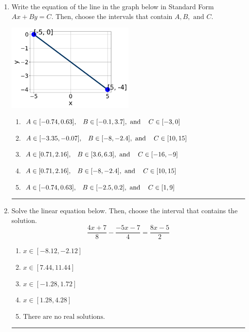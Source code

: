 \documentclass[14pt]{extbook}
\newcommand{\litem}[1]{\item#1\hspace*{-1cm}\rule{\textwidth}{0.4pt}}
\begin{document}
\begin{enumerate}
{\begin{enumerate}[label=\Alph*.]
\end{enumerate} }
\litem{
Write the equation of the line in the graph below in Standard Form $Ax+By=C$. Then, choose the intervals that contain $A, B, \text{ and } C$.
\begin{center}
    \includegraphics[width=0.5\textwidth]{../Figures/linearGraphToStandardB.png}
\end{center}
\begin{enumerate}[label=\Alph*.]
\item \( A \in [-0.74, 0.63], \hspace{3mm} B \in [-0.1, 3.7], \text{ and } \hspace{3mm} C \in [-3, 0] \)
\item \( A \in [-3.35, -0.07], \hspace{3mm} B \in [-8, -2.4], \text{ and } \hspace{3mm} C \in [10, 15] \)
\item \( A \in [0.71, 2.16], \hspace{3mm} B \in [3.6, 6.3], \text{ and } \hspace{3mm} C \in [-16, -9] \)
\item \( A \in [0.71, 2.16], \hspace{3mm} B \in [-8, -2.4], \text{ and } \hspace{3mm} C \in [10, 15] \)
\item \( A \in [-0.74, 0.63], \hspace{3mm} B \in [-2.5, 0.2], \text{ and } \hspace{3mm} C \in [1, 9] \)

\end{enumerate} }
\litem{
Solve the linear equation below. Then, choose the interval that contains the solution.\[ \frac{4x + 7}{8} - \frac{-5x -7}{4} = \frac{8x -5}{2} \]\begin{enumerate}[label=\Alph*.]
\item \( x \in [-8.12, -2.12] \)
\item \( x \in [7.44, 11.44] \)
\item \( x \in [-1.28, 1.72] \)
\item \( x \in [1.28, 4.28] \)
\item \( \text{There are no real solutions.} \)


\end{enumerate}}
\end{enumerate}
\end{document}
